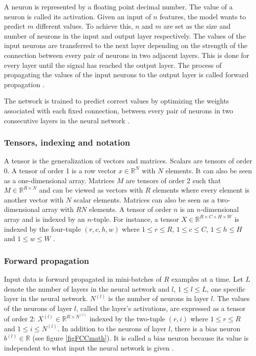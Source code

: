 \documentclass[a4paper, twoside]{article}
\begin{document}
A neuron is represented by a floating point decimal number. The value of a neuron is called its activation. Given an input of $n$ features, the model wants to predict $m$ different values. To achieve this, $n$ and $m$ are set as the size and number of neurons in the input and output layer respectively. The values of the input neurons are transferred to the next layer depending on the strength of the connection between every pair of neurons in two adjacent layers. This is done for every layer until the signal has reached the output layer. The process of propagating the values of the input neurons to the output layer is called forward propagation \cite{cs231n}.

The network is trained to predict correct values by optimizing the weights associated with each fixed connection, between every pair of neurons in two consecutive layers in the neural network \cite{cs231n}.

\subsubsection{Tensors, indexing and notation}
A tensor is the generalization of vectors and matrices. Scalars are tensors of order 0. A tensor of order 1 is a row vector $x \in \mathbb{R}^N$ with $N$ elements. It can also be seen as a one-dimensional array. Matrices $M$ are tensors of order 2 such that $M \in \mathbb{R}^{R \times N}$ and can be viewed as vectors with $R$ elements where every element is another vector with $N$ scalar elements. Matrices can also be seen as a two-dimensional array with $RN$ elements. A tensor of order $n$ is an $n$-dimensional array and is indexed by an $n$-tuple. For instance, a tensor $X \in \mathbb{R}^{R \times C \times H \times W}$ is indexed by the four-tuple $(r,c,h,w)$ where $1 \leq r \leq R$, $1 \leq c \leq C$, $1 \leq h \leq H$ and $1 \leq w \leq W$ \cite{cs231n}.

\subsubsection{Forward propagation}
Input data is forward propagated in mini-batches of $R$ examples at a time. Let $L$ denote the number of layers in the neural network and $l$, $1 \leq l \leq L$, one specific layer in the neural network. $N^{(l)}$ is the number of neurons in layer $l$. The values of the neurons of layer $l$, called the layer's activations, are expressed as a tensor of order 2: $X^{(l)} \in \mathbb{R}^{R \times N^{(l)}}$ indexed by the two-tuple $(r,i)$ where $1 \leq r \leq R$ and $1 \leq i \leq N^{(l)}$. In addition to the neurons of layer $l$, there is a bias neuron $b^{(l)} \in \mathbb{R}$ (see figure \ref{figFCCmath}). It is called a bias neuron because its value is independent to what input the neural network is given \cite{cs231n} \cite{wikiStanford}.
\end{document}
